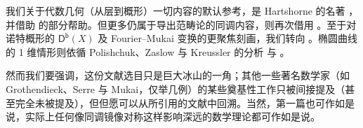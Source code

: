我们关于代数几何（从层到概形）一切内容的默认参考，是 Hartshorne 的名著 \cite{[Har77]}，并借助 \cite{[Vak17]} 的部分帮助。但更多仍属于导出范畴论的同调内容，则再次借用 \cite{[GM03]}。至于对诺特概形的 $\mathsf{D^b}(X)$ 及 Fourier--Mukai 变换的更聚焦刻画，我们转向 \cite{[Huy06]}。椭圆曲线的 1 维情形则依循 Polishchuk、Zaslow 与 Kreussler 的分析 \cite{[PZ00]} 与 \cite{[Kre00]}。

然而我们要强调，这份文献选目只是巨大冰山的一角；其他一些著名数学家（如 Grothendieck、Serre 与 Mukai，仅举几例）的某些奠基性工作只被间接提及（甚至完全未被提及），但但愿可以从所引用的文献中回溯。当然，第一篇也可作如是说，实际上任何像同调镜像对称这样影响深远的数学理论都可作如是说。



\newpage
\pagestyle{fancy}

